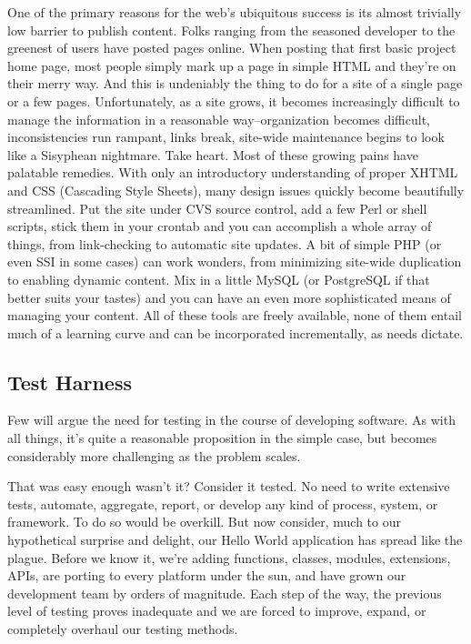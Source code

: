 \documentclass[12pt,relax]{article}
\begin{document}
One of the primary reasons for the web's ubiquitous success is its almost
trivially low barrier to publish content.  Folks ranging from the seasoned
developer to the greenest of users have posted pages online.  When posting that
first basic project home page, most people simply mark up a page in simple HTML
and they're on their merry way.  And this is undeniably the thing to do for a
site of a single page or a few pages.  Unfortunately, as a site grows, it
becomes increasingly difficult to manage the information in a reasonable
way--organization becomes difficult, inconsistencies run rampant, links break,
site-wide maintenance begins to look like a Sisyphean nightmare.  Take heart. 
Most of these growing pains have palatable remedies.  With only an introductory
understanding of proper XHTML and CSS (Cascading Style Sheets), many design
issues quickly become beautifully streamlined.    Put the site under CVS source
control, add a few Perl or shell scripts, stick them in your crontab and you
can accomplish a whole array of things, from link-checking to automatic site
updates.  A bit of simple PHP (or even SSI in some cases) can work wonders,
from minimizing site-wide duplication to enabling dynamic content.  Mix in a
little MySQL (or PostgreSQL if that better suits your tastes) and you can have
an even more sophisticated means of managing your content.  All of these tools
are freely available, none of them entail much of a learning curve and can be
incorporated incrementally, as needs dictate.

\subsection{Test Harness}

Few will argue the need for testing in the course of developing software.  As
with all things, it's quite a reasonable proposition in the simple case, but
becomes considerably more challenging as the problem scales.


That was easy enough wasn't it?  Consider it tested.  No need to write
extensive tests, automate, aggregate, report, or develop any kind of process,
system, or framework.  To do so would be overkill.  But now consider, much to
our hypothetical surprise and delight, our Hello World application has spread
like the plague.  Before we know it, we're adding functions, classes, modules,
extensions, APIs, are porting to every platform under the sun, and have grown
our development team by orders of magnitude.  Each step of the way, the
previous level of testing proves inadequate and we are forced to improve,
expand, or completely overhaul our testing methods.
\end{document}
